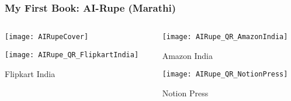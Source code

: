 \begin{frame}[fragile]\frametitle{My First Book: AI-Rupe (Marathi)}
\begin{columns}
    \begin{column}[T]{0.5\linewidth}
		\begin{center}
		\texttt{[image: AIRupeCover]}
		\end{center}	

		\begin{center}
		\texttt{[image: AIRupe\_QR\_FlipkartIndia]}
		
		Flipkart India
		\end{center}			
    \end{column}
    \begin{column}[T]{0.5\linewidth}
		\begin{center}
		\texttt{[image: AIRupe\_QR\_AmazonIndia]}
		
		Amazon India
		\end{center}	
		
		\begin{center}
		\texttt{[image: AIRupe\_QR\_NotionPress]}
		
		Notion Press
		\end{center}			
    \end{column}
  \end{columns}
  
\end{frame}